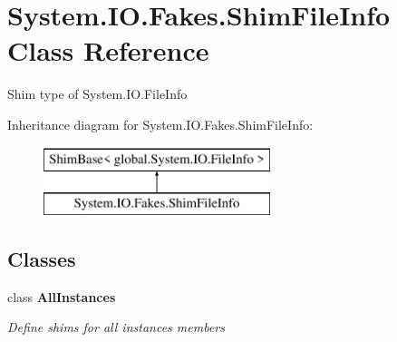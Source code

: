 \hypertarget{class_system_1_1_i_o_1_1_fakes_1_1_shim_file_info}{\section{System.\-I\-O.\-Fakes.\-Shim\-File\-Info Class Reference}
\label{class_system_1_1_i_o_1_1_fakes_1_1_shim_file_info}
}


Shim type of System.\-I\-O.\-File\-Info 


Inheritance diagram for System.\-I\-O.\-Fakes.\-Shim\-File\-Info\-:\begin{figure}[H]
\begin{center}
\leavevmode
\includegraphics[height=2.000000cm]{class_system_1_1_i_o_1_1_fakes_1_1_shim_file_info}
\end{center}
\end{figure}
\subsection*{Classes}
\begin{DoxyCompactItemize}
\item 
class {\bfseries All\-Instances}
\begin{DoxyCompactList}\small\item\em Define shims for all instances members\end{DoxyCompactList}\end{DoxyCompactItemize}
